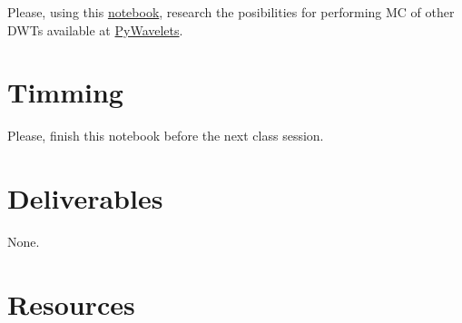 Please, using this
\href{https://github.com/Sistemas-Multimedia/Sistemas-Multimedia.github.io/blob/master/study_guide/10-MC_in_DWT_domain/DWT_shift_variance.ipynb}{notebook},
research the posibilities for performing MC of other DWTs available at
\href{https://pywavelets.readthedocs.io/en/latest/}{PyWavelets}.

\section{Timming}

Please, finish this notebook before the next class session.

\section{Deliverables}

None.

\section{Resources}


